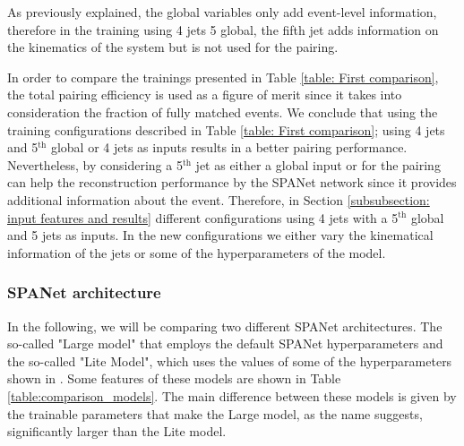 As previously explained, the global variables only add event-level information, therefore in the training using 4 jets 5 global, the fifth jet adds information on the kinematics of the system but is not used for the pairing.

In order to compare the trainings presented in Table \ref{table: First comparison}, the total pairing efficiency is used as a figure of merit since it takes into consideration the fraction of fully matched events.
We conclude that using the training configurations described in Table \ref{table: First comparison}; using 4 jets and 5$^{\text{th}}$ global or 4 jets as inputs results in a better pairing performance. Nevertheless, by considering a 5$^{\text{th}}$ jet as either a global input or for the pairing can help the reconstruction performance by the SPANet network since it provides additional information about the event. Therefore, in Section \ref{subsubsection: input features and results} different configurations using 4 jets with a 5$^{\text{th}}$ global and 5 jets as inputs. In the new configurations we either vary the kinematical information of the jets or some of the hyperparameters of the model. 

\newpage

\subsubsection{SPANet architecture} \label{large vs lite model}
In the following, we will be comparing two different SPANet architectures. The so-called "Large model" that employs the default SPANet hyperparameters and the so-called "Lite Model", which uses the values of some of the hyperparameters shown in \cite{ATLASparam}. Some features of these models are shown in Table \ref{table:comparison_models}. The main difference between these models is given by the trainable parameters that make the Large model, as the name suggests, significantly larger than the Lite model.

